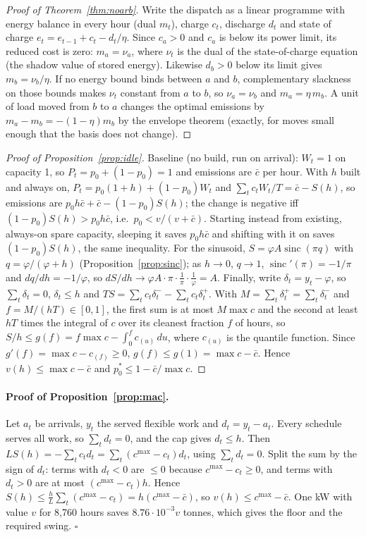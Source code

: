 \documentclass[acmsmall,review,anonymous]{acmart}
\theoremstyle{definition}
\newcommand{\sinc}{\operatorname{sinc}}
\begin{document}
\begin{proof}[Proof of Theorem~\ref{thm:noarb}]
Write the dispatch as a linear programme with energy balance in every hour (dual $m_t$),
charge $c_t$, discharge $d_t$ and state of charge $e_t=e_{t-1}+c_t-d_t/\eta$. Since $c_a>0$ and
$c_a$ is below its power limit, its reduced cost is zero: $m_a=\nu_a$, where $\nu_t$ is the
dual of the state-of-charge equation (the shadow value of stored energy). Likewise $d_b>0$ below
its limit gives $m_b=\nu_b/\eta$. If no energy bound binds between $a$ and $b$,
complementary slackness on those bounds makes $\nu_t$ constant from $a$ to $b$, so
$\nu_a=\nu_b$ and $m_a=\eta\,m_b$. A unit of load moved from $b$ to $a$ changes the optimal
emissions by $m_a-m_b=-(1-\eta)m_b$ by the envelope theorem (exactly, for moves small enough
that the basis does not change).
\end{proof}

\begin{proof}[Proof of Proposition~\ref{prop:idle}]
Baseline (no build, run on arrival): $W_t=1$ on capacity 1, so $P_t=p_0+(1-p_0)=1$ and
emissions are $\bar c$ per hour. With $h$ built and always on, $P_t=p_0(1+h)+(1-p_0)W_t$ and
$\sum_tc_tW_t/T=\bar c-S(h)$, so emissions are $p_0h\bar c+\bar c-(1-p_0)S(h)$; the change is
negative iff $(1-p_0)S(h)>p_0h\bar c$, i.e.\ $p_0<v/(v+\bar c)$. Starting instead from existing,
always-on spare capacity, sleeping it saves $p_0h\bar c$ and shifting with it on saves
$(1-p_0)S(h)$, the same inequality. For the sinusoid, $S=\varphi A\sinc(\pi q)$ with
$q=\varphi/(\varphi+h)$ (Proposition~\ref{prop:sinc}); as $h\to0$, $q\to1$,
$\sinc'(\pi)=-1/\pi$ and $dq/dh=-1/\varphi$, so $dS/dh\to\varphi A\cdot\pi\cdot\frac1\pi\cdot\frac1\varphi=A$.
Finally, write $\delta_t=y_t-\varphi$, so $\sum_t\delta_t=0$, $\delta_t\le h$ and
$TS=\sum_tc_t\delta_t^--\sum_tc_t\delta_t^+$. With $M=\sum_t\delta_t^+=\sum_t\delta_t^-$ and
$f=M/(hT)\in[0,1]$, the first sum is at most $M\max c$ and the second at least $hT$ times the
integral of $c$ over its cleanest fraction $f$ of hours, so $S/h\le g(f)=f\max c-\int_0^f c_{(u)}\,du$,
where $c_{(u)}$ is the quantile function. Since $g'(f)=\max c-c_{(f)}\ge0$, $g(f)\le g(1)=\max c-\bar c$.
Hence $v(h)\le\max c-\bar c$ and $p_0^*\le1-\bar c/\max c$.
\end{proof}


\paragraph{Proof of Proposition~\ref{prop:mac}.} Let $a_t$ be arrivals, $y_t$ the served
flexible work and $d_t=y_t-a_t$. Every schedule serves all work, so $\sum_td_t=0$, and the cap
gives $d_t\le h$. Then $LS(h)=-\sum_tc_td_t=\sum_t(c^{\max}-c_t)d_t$, using $\sum_td_t=0$.
Split the sum by the sign of $d_t$: terms with $d_t<0$ are $\le0$ because $c^{\max}-c_t\ge0$, and
terms with $d_t>0$ are at most $(c^{\max}-c_t)h$. Hence
$S(h)\le\frac hL\sum_t(c^{\max}-c_t)=h(c^{\max}-\bar c)$, so $v(h)\le c^{\max}-\bar c$. One kW
with value $v$ for 8{,}760 hours saves $8.76\cdot10^{-3}v$ tonnes, which gives the floor and the
required swing. \hfill$\square$
\end{document}
